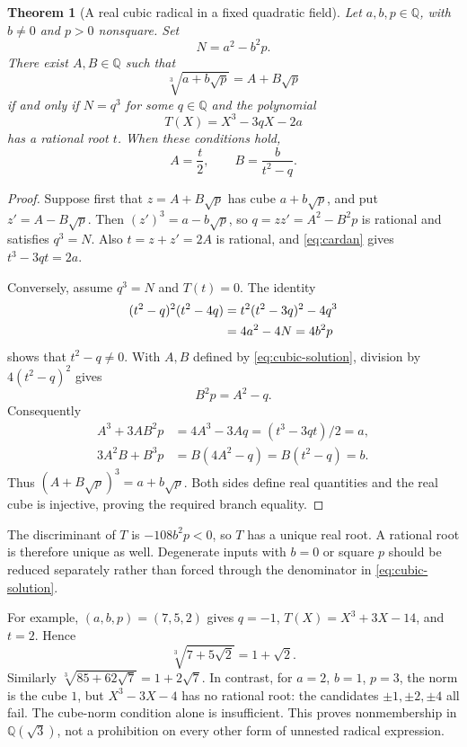 \documentclass[11pt,a4paper]{article}
\numberwithin{equation}{section}
\newtheorem{theorem}{Theorem}[section]
\theoremstyle{definition}\newtheorem{definition}[theorem]{Definition}
\theoremstyle{remark}\newtheorem{remark}[theorem]{Remark}
\newcommand{\Q}{\mathbb Q}\newcommand{\R}{\mathbb R}\newcommand{\C}{\mathbb C}\newcommand{\Z}{\mathbb Z}
\begin{document}
\begin{theorem}[A real cubic radical in a fixed quadratic field]\label{thm:cubic}
Let $a,b,p\in\Q$, with $b\ne0$ and $p>0$ nonsquare. Set
\[
N=a^2-b^2p.
\]
There exist $A,B\in\Q$ such that
\[
\sqrt[3]{a+b\sqrt p}=A+B\sqrt p
\]
if and only if $N=q^3$ for some $q\in\Q$ and the polynomial
\begin{equation}\label{eq:cubic-test}
T(X)=X^3-3qX-2a
\end{equation}
has a rational root $t$. When these conditions hold,
\begin{equation}\label{eq:cubic-solution}
A=\frac t2,\qquad B=\frac{b}{t^2-q}.
\end{equation}
\end{theorem}
\begin{proof}
Suppose first that $z=A+B\sqrt p$ has cube $a+b\sqrt p$, and put $z'=A-B\sqrt p$. Then $(z')^3=a-b\sqrt p$, so $q=zz'=A^2-B^2p$ is rational and satisfies $q^3=N$. Also $t=z+z'=2A$ is rational, and \eqref{eq:cardan} gives $t^3-3qt=2a$.

Conversely, assume $q^3=N$ and $T(t)=0$. The identity
\begin{align}
(t^2-q)^2(t^2-4q)
 &=t^2(t^2-3q)^2-4q^3\notag\\
 &=4a^2-4N=4b^2p
 \label{eq:cubic-certificate}
\end{align}
shows that $t^2-q\ne0$. With $A,B$ defined by \eqref{eq:cubic-solution}, division by $4(t^2-q)^2$ gives
\[
B^2p=A^2-q.
\]
Consequently
\begin{align*}
A^3+3AB^2p&=4A^3-3Aq=(t^3-3qt)/2=a,\\
3A^2B+B^3p&=B(4A^2-q)=B(t^2-q)=b.
\end{align*}
Thus $(A+B\sqrt p)^3=a+b\sqrt p$. Both sides define real quantities and the real cube is injective, proving the required branch equality.
\end{proof}

The discriminant of $T$ is $-108b^2p<0$, so $T$ has a unique real root. A rational root is therefore unique as well. Degenerate inputs with $b=0$ or square $p$ should be reduced separately rather than forced through the denominator in \eqref{eq:cubic-solution}.

For example, $(a,b,p)=(7,5,2)$ gives $q=-1$, $T(X)=X^3+3X-14$, and $t=2$. Hence
\[
\sqrt[3]{7+5\sqrt2}=1+\sqrt2.
\]
Similarly $\sqrt[3]{85+62\sqrt7}=1+2\sqrt7$. In contrast, for $a=2$, $b=1$, $p=3$, the norm is the cube $1$, but $X^3-3X-4$ has no rational root: the candidates $\pm1,\pm2,\pm4$ all fail. The cube-norm condition alone is insufficient. This proves nonmembership in $\Q(\sqrt3)$, not a prohibition on every other form of unnested radical expression.
\end{document}
